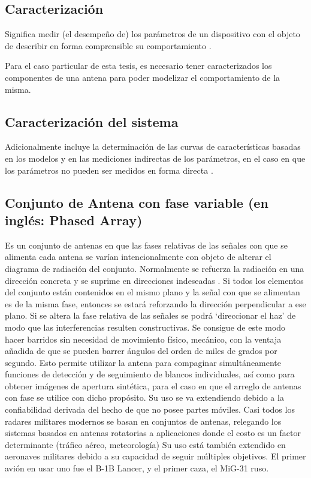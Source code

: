 \subsection{Caracterización}

Significa medir (el desempeño de) los parámetros de un dispositivo con el objeto de describir en
forma comprensible su comportamiento \cite{Mittermayer2007}.

Para el caso particular de esta tesis, es necesario tener caracterizados los componentes de una antena para poder modelizar el 
comportamiento de la misma.


\subsection{Caracterización del sistema}

Adicionalmente incluye la determinación de las curvas de características basadas
en los modelos y en las mediciones indirectas de los parámetros, en el caso en que los parámetros no pueden ser medidos
en forma directa \cite{Mittermayer2007}.


\subsection{Conjunto de Antena con fase variable (en inglés: Phased Array)}

Es un conjunto de antenas en que las fases relativas de las señales con que se alimenta cada antena se varían intencionalmente
con objeto de alterar el diagrama de radiación del conjunto. Normalmente se refuerza la radiación en una dirección concreta y
se suprime en direcciones indeseadas \cite{Standard1996}. Si todos los elementos del conjunto están contenidos en el mismo plano
y la señal con que se alimentan es de la misma fase, entonces se estará reforzando la dirección perpendicular a ese plano. Si
se altera la fase relativa de las señales se podrá \enquote*{direccionar el haz} de modo que las interferencias resulten
constructivas. Se consigue de este modo hacer barridos sin necesidad de movimiento físico, mecánico, con la ventaja añadida de
que se pueden barrer ángulos del orden de miles de grados por segundo. Esto permite utilizar la antena para compaginar
simultáneamente funciones de detección y de seguimiento de blancos individuales, así como para obtener imágenes de apertura
sintética, para el caso en que el arreglo de antenas con fase se utilice con dicho propósito. Su uso se va extendiendo debido a
la confiabilidad derivada del hecho de que no posee partes móviles. Casi todos los radares militares modernos se basan en
conjuntos de antenas, relegando los sistemas basados en antenas rotatorias a aplicaciones donde el costo es un factor
determinante (tráfico aéreo, meteorología) Su uso está también extendido en aeronaves militares debido a su capacidad de
seguir múltiples objetivos. El primer avión en usar uno fue el B-1B Lancer, y el primer caza, el MiG-31 ruso.

